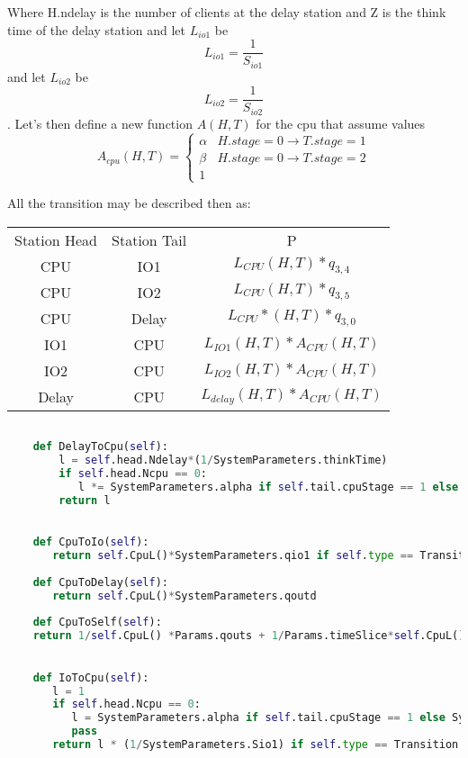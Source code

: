 \documentclass[12pt,a4paper]{article}
\begin{document}
Where H.ndelay is the number of clients at the delay station and Z is the think time of the delay station and let $L_{io1}$ be
$$
    L_{io1} = \frac{1}{S_{io1}}  
$$ and let $L_{io2}$ be 
$$
    L_{io2}= \frac{1}{S_{io2}}
$$
. Let's then define a new function $A(H,T)$ for the cpu that assume values 
$$
A_{cpu}(H,T)=
\begin{cases}
    \alpha & H.stage = 0 \rightarrow T.stage = 1 \\
    \beta & H.stage = 0 \rightarrow T.stage = 2 \\
    1
\end{cases}
$$


All the transition may be described then as:

\begin{center}
    \begin{tabular}{ |c|c|c| } 
     \hline
     Station Head & Station Tail & P \\ 
     CPU & IO1 & $L_{CPU}(H,T)* q_{3,4}$ \\
     CPU & IO2 & $L_{CPU}(H,T)* q_{3,5}$\\
     CPU & Delay & $L_{CPU}*(H,T) * q_{3,0}$ \\ 
     IO1 & CPU & $L_{IO1}(H,T) * A_{CPU}(H,T)$ \\
     IO2& CPU & $L_{IO2}(H,T)* A_{CPU}(H,T)$ \\
     Delay & CPU & $L_{delay}(H,T)*A_{CPU}(H,T)$\\
     \hline
    \end{tabular}
    \end{center}

    \begin{lstlisting}[language=python]

    def DelayToCpu(self):
        l = self.head.Ndelay*(1/SystemParameters.thinkTime)
        if self.head.Ncpu == 0:
           l *= SystemParameters.alpha if self.tail.cpuStage == 1 else  SystemParameters.beta
        return l
        

    def CpuToIo(self):      
       return self.CpuL()*SystemParameters.qio1 if self.type == Transition.TransitionType.CPU_TO_IO1 else self.CpuL()*SystemParameters.qio2
        
    def CpuToDelay(self):
       return self.CpuL()*SystemParameters.qoutd
        
    def CpuToSelf(self):
    return 1/self.CpuL() *Params.qouts + 1/Params.timeSlice*self.CpuL()

        
    def IoToCpu(self):
       l = 1
       if self.head.Ncpu == 0:
          l = SystemParameters.alpha if self.tail.cpuStage == 1 else SystemParameters.beta
          pass
       return l * (1/SystemParameters.Sio1) if self.type == Transition.TransitionType.IO1_TO_CPU else l* (1/SystemParameters.Sio2)
        \end{lstlisting}
\end{document}
